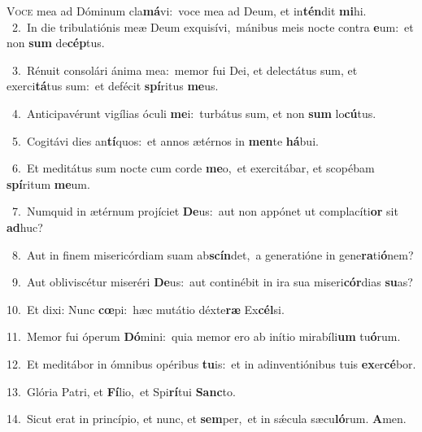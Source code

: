\lettrine{\initial\textcolor{\initialcolor}{V}}{oce} mea ad Dóminum cla\-\textbf{má}\-vi:~\star voce mea ad Deum, et in\-\textbf{tén}\-dit \textbf{mi}\-hi.\\
{\numbfont\textcolor{\numbcolor}{~2.}}~In die tribulatiónis meæ Deum exquisívi,~\dagger mánibus meis nocte contra \textbf{e}\-um:~\star et non \textbf{sum} de\-\textbf{cép}\-tus.\par
{\numbfont\textcolor{\numbcolor}{~3.}}~Rénuit consolári ánima mea:~\dagger memor fui Dei, et delectátus sum, et exerci\-\textbf{tá}\-tus sum:~\star et defécit \textbf{spí}\-ritus \textbf{me}\-us.\par
{\numbfont\textcolor{\numbcolor}{~4.}}~Anticipavérunt vigílias óculi \textbf{me}\-i:~\star turbátus sum, et non \textbf{sum} lo\-\textbf{cú}\-tus.\par
{\numbfont\textcolor{\numbcolor}{~5.}}~Cogitávi dies an\-\textbf{tí}\-quos:~\star et annos ætérnos in \textbf{men}\-te \textbf{há}\-bui.\par
{\numbfont\textcolor{\numbcolor}{~6.}}~Et meditátus sum nocte cum corde \textbf{me}\-o,~\star et exercitábar, et scopébam \textbf{spí}\-ritum \textbf{me}\-um.\par
{\numbfont\textcolor{\numbcolor}{~7.}}~Numquid in ætérnum projíciet \textbf{De}\-us:~\star aut non appónet ut complacíti\textbf{or} sit \textbf{ad}\-huc?\par
{\numbfont\textcolor{\numbcolor}{~8.}}~Aut in finem misericórdiam suam ab\-\textbf{scín}\-det,~\star a generatióne in gene\-\textbf{ra}\-ti\-\textbf{ó}\-nem?\par
{\numbfont\textcolor{\numbcolor}{~9.}}~Aut obliviscétur miseréri \textbf{De}\-us:~\star aut continébit in ira sua miseri\-\textbf{cór}\-dias \textbf{su}\-as?\par
{\numbfont\textcolor{\numbcolor}{10.}}~Et dixi: Nunc \textbf{cœ}\-pi:~\star hæc mutátio déxte\textbf{ræ} Ex\-\textbf{cél}\-si.\par
{\numbfont\textcolor{\numbcolor}{11.}}~Memor fui óperum \textbf{Dó}\-mini:~\star quia memor ero ab inítio mirabíli\textbf{um} tu\-\textbf{ó}\-rum.\par
{\numbfont\textcolor{\numbcolor}{12.}}~Et meditábor in ómnibus opéribus \textbf{tu}\-is:~\star et in adinventiónibus tuis \textbf{ex}\-er\-\textbf{cé}\-bor.\par
{\numbfont\textcolor{\numbcolor}{13.}}~Glória Patri, et \textbf{Fí}\-lio,~\star et Spi\-\textbf{rí}\-tui \textbf{Sanc}\-to.\par
{\numbfont\textcolor{\numbcolor}{14.}}~Sicut erat in princípio, et nunc, et \textbf{sem}\-per,~\star et in sǽcula sæcu\-\textbf{ló}\-rum. \textbf{A}\-men.\par

